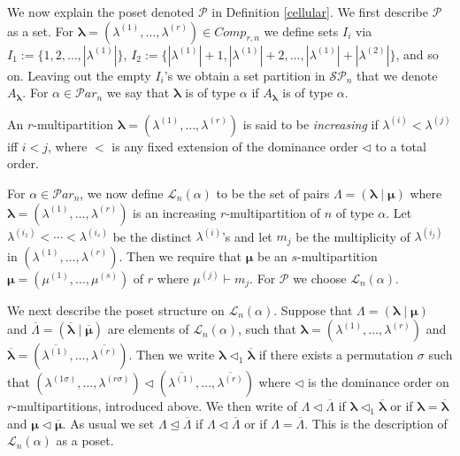 \documentclass[10pt,a4,twoside,hidelinks,rm]{article}
\newcommand{\PP}{{\mathcal P}}
\newcommand{\Par}{{\mathcal Par}_n}
\newcommand{\MC}{{ {Comp}}_{r,n}}
\newcommand\blambda{{\boldsymbol\lambda}}
\newcommand\bmu{{\boldsymbol\mu}}
\theoremstyle{plain}
\begin{document}
\medskip
We now explain the poset denoted $ \PP $ in Definition
\ref{cellular}. We first describe $ \PP $ as a set.
For $ \blambda = (\lambda^{(1)}, \ldots , \lambda^{(r)}) \in \MC $
we define sets
$ I_i  $ via
 $ I_1:=\{1, 2, \ldots, |\lambda^{(1)}|\} $, 
$ I_2:=\{|\lambda^{(1)}|+1, |\lambda^{(1)}|+2, \ldots, |\lambda^{(1)}|+|\lambda^{(2)}|\} $, and so on.
Leaving out the empty $ I_i $'s we obtain a set partition
in $ \mathcal{SP}_n $ that we denote
$ A_{\blambda} $.
For $ \alpha \in \Par $ we say that $ \blambda $ is of type $ \alpha $ if $ A_{\blambda} $ is of
type $ \alpha$.

An $ r$-multipartition $ \blambda
= (\lambda^{(1)}, \ldots , \lambda^{(r)}) $ is said to be \textit{increasing}
if $\lambda^{(i)} < \lambda^{(j)} $ iff $ i < j $, where  $ < $ is
any fixed extension of the dominance order $ \lhd $ to a
total order.

\medskip
For $ \alpha \in \Par$, we now define 
$ {\mathcal L}_n(\alpha) $ to be 
the set of pairs $ \Lambda =
(\blambda \mid \bmu) $ where $ \blambda = ( \lambda^{(1)}, \ldots ,
\lambda^{(r)})$ is an increasing $r$-multipartition of $ n $ of type $ \alpha ${\color{black}.}
Let $ \lambda^{(i_1)}  < \cdots < 
\lambda^{(i_s)} $ be the distinct $ \lambda^{(i)} $'s and let $ m_j $ be the multiplicity of
$ \lambda^{(i_j)} $ in $ ( \lambda^{(1)}, \ldots ,\lambda^{(r)}) $. Then we require that $ \bmu $ be
an $s$-multipartition $ \bmu = (\mu^{(1)}, \ldots,  \mu^{(s)}) $ of $ r $
where $ \mu^{(j)} \vdash m_j $. For $ \PP$ we choose $ {\mathcal L}_n(\alpha) $.

\medskip


We next describe the poset structure on $ {\mathcal L}_n(\alpha) $. 
Suppose that $ \Lambda =(\blambda \mid \bmu) $ and $
\overline{\Lambda} =(\overline{\blambda}\mid \overline{\bmu} ) $ are
elements of $  {\mathcal L}_n(\alpha) $, such
that $ \blambda = (\lambda^{(1)}, \ldots, \lambda^{(r)}) $ and
$ \overline{\blambda} = (\overline{\lambda^{(1)}}, \ldots, \overline{\lambda^{(r)}}) $.
Then we write $ \blambda \lhd_1 \overline{\blambda} $ if
there exists a permutation $ \sigma $ such that
$ (\lambda^{ (1 \sigma) }, \ldots, \lambda^{ (r\sigma )}) \lhd (\overline{\lambda^{(1)}}, \ldots,
\overline{\lambda^{(r)}})$
where $\lhd$ is the dominance order on $r$-multi\-partitions, introduced above.
We then write of $ \Lambda \lhd \overline{\Lambda} $ if $ \blambda \lhd_1 \overline{\blambda} $
or if $ \blambda =\overline{\blambda} $ and
{$ \bmu \lhd \overline{\bmu}$.}
As usual we set $ \Lambda \unlhd \overline{\Lambda} $ if $ \Lambda \lhd \overline{\Lambda} $ or if
$ \Lambda = \overline{\Lambda} $.
This is the description of $ {\mathcal L}_n(\alpha) $ as a poset.
\end{document}
